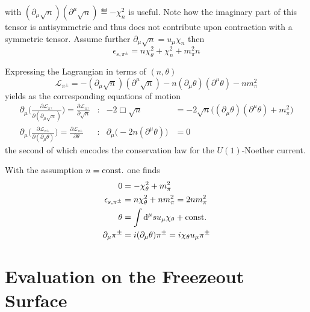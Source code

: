with $(\partial_\mu\sqrt{n})(\partial^\mu\sqrt{n})\eqdef -\chi_n^2$ is useful. Note how the imaginary part of this tensor is antisymmetric and thus does not contribute upon contraction with a symmetric tensor. Assume further $\partial_\mu\sqrt{n}=u_\mu\chi_n$ then
\begin{equation}
    \epsilon_{s,\pi^\pm}=n\chi_\theta^2+\chi_n^2+m_\pi^2n
\end{equation}

Expressing the Lagrangian in terms of $(n,\theta)$ 
\begin{equation}
    \mathscr{L}_{\pi^\pm}=-(\partial_\mu\sqrt{n})(\partial^\mu\sqrt{n})-n(\partial_\mu\theta)(\partial^\mu\theta)-nm_\pi^2
\end{equation}
yields as the corresponding equations of motion
\begin{subequations}
    \begin{align}
        \partial_\mu\Bigg(\frac{\partial\mathscr{L}_{\pi^\pm}}{\partial(\partial_\mu\sqrt{n})}\Bigg)=\frac{\partial\mathscr{L}_{\pi^\pm}}{\partial\sqrt{n}}&:&-2\Box\sqrt{n}&=-2\sqrt{n}\big((\partial_\mu\theta)(\partial^\mu\theta)+m_\pi^2\big)\\
        \partial_\mu\Bigg(\frac{\partial\mathscr{L}_{\pi^\pm}}{\partial(\partial_\mu\theta)}\Bigg)=\frac{\partial\mathscr{L}_{\pi^\pm}}{\partial\theta}&:&\partial_\mu\big(-2n(\partial^\mu\theta)\big)&=0
    \end{align}
\end{subequations}
the second of which encodes the conservation law for the $U(1)$-Noether current.

With the assumption $n={\text{const.}}$ one finds
\begin{subequations}
    \begin{align}
        0&=-\chi_\theta^2+m_\pi^2\\
        \epsilon_{s,\pi^\pm}&=n\chi_\theta^2+nm_\pi^2=2nm_\pi^2\\
        \theta&=\int\text{d}^\mu su_\mu \chi_\theta+{\text{const.}}\\
        \partial_\mu\pi^\pm&={i}(\partial_\mu\theta)\pi^\pm={i}\chi_\theta u_\mu\pi^\pm
    \end{align}
\end{subequations}

\section{Evaluation on the Freezeout Surface}

